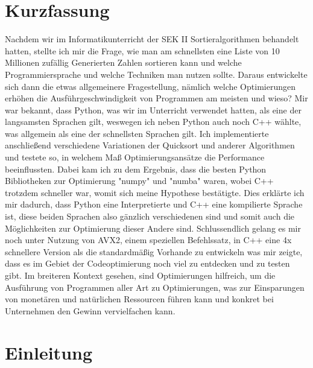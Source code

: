 \documentclass[12pt,a4paper]{article}
\begin{document}
\section*{Kurzfassung}
Nachdem wir im Informatikunterricht der SEK II Sortieralgorithmen behandelt hatten,
stellte ich mir die Frage, wie man am schnellsten eine Liste von 10 Millionen zufällig Generierten Zahlen
sortieren kann und welche Programmiersprache und welche Techniken man nutzen sollte.
Daraus entwickelte sich dann die etwas allgemeinere Fragestellung, 
\newline nämlich welche Optimierungen erhöhen die Ausführgeschwindigkeit von Programmen am meisten und wieso?
Mir war bekannt, dass Python, was wir im Unterricht verwendet hatten, als eine der langsamsten \newline Sprachen gilt, 
weswegen ich neben Python auch noch C++ wählte, was allgemein als eine der schnellsten Sprachen gilt.
Ich implementierte anschließend verschiedene Variationen der Quicksort und anderer Algorithmen und testete so, 
in welchem Maß Optimierungsansätze die Performance beeinflussten.
Dabei kam ich zu dem Ergebnis, dass die besten Python Bibliotheken zur Optimierung "numpy" und "numba" waren,
wobei C++ trotzdem schneller war, womit sich meine Hypothese bestätigte.
Dies erklärte ich mir dadurch, dass Python eine Interpretierte und C++ eine kompilierte Sprache ist, diese
beiden Sprachen also gänzlich verschiedenen sind und somit auch die Möglichkeiten zur Optimierung dieser Andere sind.
Schlussendlich gelang es mir noch unter Nutzung von AVX2, einem speziellen Befehlssatz, in C++ eine 4x schnellere Version als die standardmäßig 
Vorhande zu entwickeln was mir zeigte, dass es im Gebiet der Codeoptimierung noch viel zu entdecken und zu
testen gibt.
Im breiteren Kontext gesehen, sind Optimierungen hilfreich, um die Ausführung von Programmen aller Art zu Optimierungen,
was zur Einsparungen von monetären und natürlichen Ressourcen führen kann und konkret bei Unternehmen den Gewinn
vervielfachen kann.

\clearpage
\renewcommand*\contentsname{Inhaltsverzeichnis}
\tableofcontents

\clearpage

\section{Einleitung}
\end{document}
